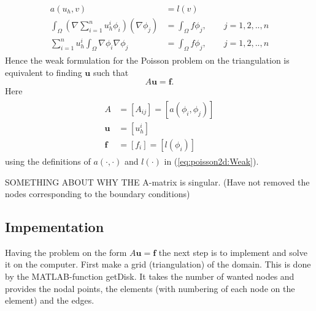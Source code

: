\documentclass[paper=a4, fontsize=11pt]{scrartcl} %
\begin{document}
\begin{eqnarray}
\begin{aligned}
\nonumber
a(u_h,v) &= l(v) \\
\int_{\Omega}(\nabla\sum\limits_{i=1}^n u^i_h\phi_i)(\nabla\phi_j) &= \int_{\Omega}\! f \phi_j, \qquad j=1,2,..,n \\
\sum\limits_{i=1}^n u^i_h\int_{\Omega}\nabla\phi_i \nabla\phi_j &= \int_{\Omega}\! f \phi_j, \qquad j=1,2,..,n
\end{aligned}
\end{eqnarray}
Hence the weak formulation for the Poisson problem on the triangulation is equivalent to finding $\mathbf{u}$ such that
\[A\mathbf{u}=\mathbf{f}.\]  
Here
\begin{eqnarray}
\begin{aligned}
\nonumber
A &= [A_{ij}]=[a(\phi_i,\phi_j)]\\
\mathbf{u} &= [u_{h}^i] \\
\mathbf{f} &= [f_i]=[l(\phi_i)]
\end{aligned}
\end{eqnarray}
using the definitions of $a(\cdot,\cdot)$ and $l(\cdot)$ in (\ref{eq:poisson2d:Weak}).

SOMETHING ABOUT WHY THE A-matrix is singular. (Have not removed the nodes corresponding to the boundary conditions)

\subsection{Impementation}
Having the problem on the form $A\mathbf{u}=\mathbf{f}$ the next step is to implement and solve it on the computer. First make a grid (triangulation) of the domain. This is done by the MATLAB-function getDisk. It takes the number of wanted nodes and provides the nodal points, the elements (with numbering of each node on the element) and the edges.
\end{document}
